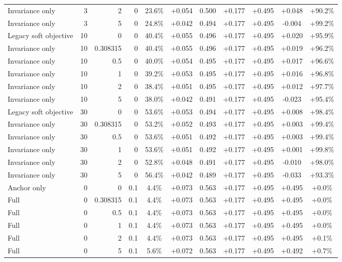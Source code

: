 \begin{table}[htbp]
\begin{tabular}{lrrrccccccc}
Invariance only & 3 & 2 & 0 & 23.6\% & +0.054 & 0.500 & +0.177 & +0.495 & +0.048 & +90.2\% \\
Invariance only & 3 & 5 & 0 & 24.8\% & +0.042 & 0.494 & +0.177 & +0.495 & -0.004 & +99.2\% \\
Legacy soft objective & 10 & 0 & 0 & 40.4\% & +0.055 & 0.496 & +0.177 & +0.495 & +0.020 & +95.9\% \\
Invariance only & 10 & 0.308315 & 0 & 40.4\% & +0.055 & 0.496 & +0.177 & +0.495 & +0.019 & +96.2\% \\
Invariance only & 10 & 0.5 & 0 & 40.0\% & +0.054 & 0.495 & +0.177 & +0.495 & +0.017 & +96.6\% \\
Invariance only & 10 & 1 & 0 & 39.2\% & +0.053 & 0.495 & +0.177 & +0.495 & +0.016 & +96.8\% \\
Invariance only & 10 & 2 & 0 & 38.4\% & +0.051 & 0.495 & +0.177 & +0.495 & +0.012 & +97.7\% \\
Invariance only & 10 & 5 & 0 & 38.0\% & +0.042 & 0.491 & +0.177 & +0.495 & -0.023 & +95.4\% \\
Legacy soft objective & 30 & 0 & 0 & 53.6\% & +0.053 & 0.494 & +0.177 & +0.495 & +0.008 & +98.4\% \\
Invariance only & 30 & 0.308315 & 0 & 53.2\% & +0.052 & 0.493 & +0.177 & +0.495 & +0.003 & +99.4\% \\
Invariance only & 30 & 0.5 & 0 & 53.6\% & +0.051 & 0.492 & +0.177 & +0.495 & +0.003 & +99.4\% \\
Invariance only & 30 & 1 & 0 & 53.6\% & +0.051 & 0.492 & +0.177 & +0.495 & +0.001 & +99.8\% \\
Invariance only & 30 & 2 & 0 & 52.8\% & +0.048 & 0.491 & +0.177 & +0.495 & -0.010 & +98.0\% \\
Invariance only & 30 & 5 & 0 & 56.4\% & +0.042 & 0.489 & +0.177 & +0.495 & -0.033 & +93.3\% \\
Anchor only & 0 & 0 & 0.1 & 4.4\% & +0.073 & 0.563 & +0.177 & +0.495 & +0.495 & +0.0\% \\
Full & 0 & 0.308315 & 0.1 & 4.4\% & +0.073 & 0.563 & +0.177 & +0.495 & +0.495 & +0.0\% \\
Full & 0 & 0.5 & 0.1 & 4.4\% & +0.073 & 0.563 & +0.177 & +0.495 & +0.495 & +0.0\% \\
Full & 0 & 1 & 0.1 & 4.4\% & +0.073 & 0.563 & +0.177 & +0.495 & +0.495 & +0.0\% \\
Full & 0 & 2 & 0.1 & 4.4\% & +0.073 & 0.563 & +0.177 & +0.495 & +0.495 & +0.1\% \\
Full & 0 & 5 & 0.1 & 5.6\% & +0.072 & 0.563 & +0.177 & +0.495 & +0.492 & +0.7\% \\

\end{tabular}
\end{table}
